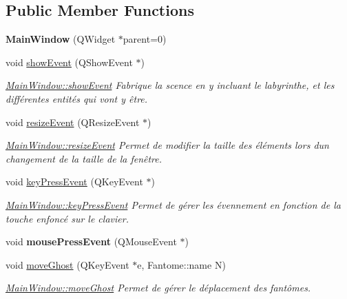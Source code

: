 \subsection*{Public Member Functions}
\begin{DoxyCompactItemize}
\item 
\hypertarget{class_main_window_a8b244be8b7b7db1b08de2a2acb9409db}{}{\bfseries Main\+Window} (Q\+Widget $\ast$parent=0)\label{class_main_window_a8b244be8b7b7db1b08de2a2acb9409db}

\item 
\hypertarget{class_main_window_a2e0ce6e999817f456b6d94adf80b8faf}{}void \hyperlink{class_main_window_a2e0ce6e999817f456b6d94adf80b8faf}{show\+Event} (Q\+Show\+Event $\ast$)\label{class_main_window_a2e0ce6e999817f456b6d94adf80b8faf}

\begin{DoxyCompactList}\small\item\em \hyperlink{class_main_window_a2e0ce6e999817f456b6d94adf80b8faf}{Main\+Window\+::show\+Event} Fabrique la scence en y incluant le labyrinthe, et les différentes entités qui vont y être. \end{DoxyCompactList}\item 
\hypertarget{class_main_window_a8851a931482834eeec527490eedaf20e}{}void \hyperlink{class_main_window_a8851a931482834eeec527490eedaf20e}{resize\+Event} (Q\+Resize\+Event $\ast$)\label{class_main_window_a8851a931482834eeec527490eedaf20e}

\begin{DoxyCompactList}\small\item\em \hyperlink{class_main_window_a8851a931482834eeec527490eedaf20e}{Main\+Window\+::resize\+Event} Permet de modifier la taille des éléments lors d\textquotesingle{}un changement de la taille de la fenêtre. \end{DoxyCompactList}\item 
void \hyperlink{class_main_window_a6b8e934fca603cf7678eabb9a6dfc709}{key\+Press\+Event} (Q\+Key\+Event $\ast$)
\begin{DoxyCompactList}\small\item\em \hyperlink{class_main_window_a6b8e934fca603cf7678eabb9a6dfc709}{Main\+Window\+::key\+Press\+Event} Permet de gérer les évennement en fonction de la touche enfoncé sur le clavier. \end{DoxyCompactList}\item 
\hypertarget{class_main_window_a849e207918b12307f9cd0a576076946b}{}void {\bfseries mouse\+Press\+Event} (Q\+Mouse\+Event $\ast$)\label{class_main_window_a849e207918b12307f9cd0a576076946b}

\item 
void \hyperlink{class_main_window_aa626dd9c66b3231ec5d8f123e991af1b}{move\+Ghost} (Q\+Key\+Event $\ast$e, Fantome\+::name N)
\begin{DoxyCompactList}\small\item\em \hyperlink{class_main_window_aa626dd9c66b3231ec5d8f123e991af1b}{Main\+Window\+::move\+Ghost} Permet de gérer le déplacement des fantômes. \end{DoxyCompactList}\end{DoxyCompactItemize}


